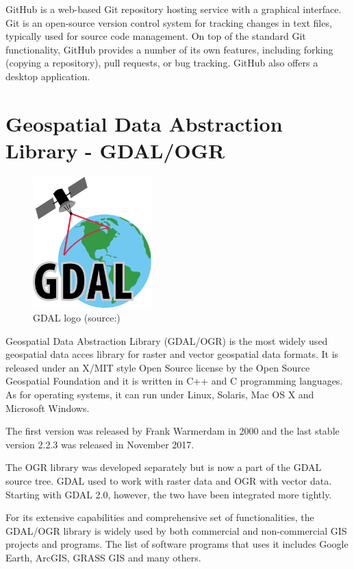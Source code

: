 GitHub is a web-based Git repository hosting service with a graphical interface. Git is an open-source version control system for tracking changes in text files, typically used for source code management.\cite{git}  On top of the standard Git functionality, GitHub provides a number of its own features, including forking (copying a repository), pull requests, or bug tracking. GitHub also offers a desktop application.

\section{Geospatial Data Abstraction Library - GDAL/OGR}

\begin{figure}[H] \centering
      \includegraphics[width=130pt]{./pictures/gdal.png}
      \caption[GDAL logo]{GDAL logo (source:{\cite{gdal}})}
      \label{fig:GDAL}
  \end{figure}

Geospatial Data Abstraction Library (GDAL/OGR) is the most widely used geospatial data acces library for raster and vector geospatial data formats. It is released under an X/MIT style Open Source license by the Open Source Geospatial Foundation and it is written in C++ and C programming languages. As for operating systems, it can run under Linux, Solaris, Mac OS X and Microsoft Windows.\cite{gdal}

The first version was released by Frank Warmerdam in 2000 and the last stable version 2.2.3 was released in November 2017.\cite{gdalrelease}


The OGR library was developed separately but is now a part of the GDAL source tree. GDAL used to work with raster data and OGR with vector data. Starting with GDAL 2.0, however, the two have been integrated more tightly.

For its extensive capabilities and comprehensive set of functionalities, the GDAL/OGR library is widely used by both commercial and non-commercial GIS projects and programs. The list of software programs that uses it includes Google Earth, ArcGIS, GRASS GIS and many others.\cite{gdalogr} 
